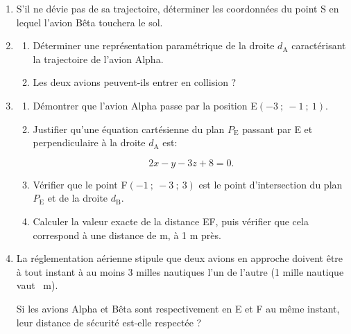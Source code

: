\begin{enumerate}
\item S'il ne dévie pas de sa trajectoire, déterminer les coordonnées du point S en lequel l'avion Bêta touchera le sol.
\item 
	\begin{enumerate}
		\item Déterminer une représentation paramétrique de la droite $d_{\text{A}}$ caractérisant la trajectoire de l'avion Alpha.
		\item Les deux avions peuvent-ils entrer en collision ?
	\end{enumerate}
\item 
	\begin{enumerate}
		\item Démontrer que l'avion Alpha passe par la position E$(-3~;~-1~;~1)$.
		\item Justifier qu'une équation cartésienne du plan $P_{\text{E}}$ passant par E et perpendiculaire à la droite $d_{\text{A}}$ est:

\[2x - y - 3z + 8 = 0.\]
		\item Vérifier que le point F$(-1~;~-3~;~3)$ est le point d'intersection du plan $P_{\text{E}}$ et de la droite $d_{\text{B}}$.
		\item Calculer la valeur exacte de la distance EF, puis vérifier que cela correspond à une distance de  m, à 1 m près.
	\end{enumerate}
\item La réglementation aérienne stipule que deux avions en approche doivent être à tout instant à au moins 3 milles nautiques l'un de l'autre (1 mille nautique vaut ~m).

Si les avions Alpha et Bêta sont respectivement en E et F au même instant, leur distance de sécurité est-elle respectée ?
\end{enumerate}

\bigskip
